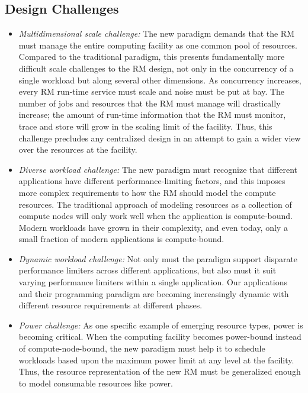 \documentclass[10pt]{article}
\begin{document}
\subsection{Design Challenges}
\label{sect:challenges}

\begin{itemize}
\item{\sl Multidimensional scale challenge:} The new paradigm demands that 
      the RM must manage the entire computing facility as one common pool of 
      resources. Compared to the traditional paradigm, this presents 
      fundamentally more difficult scale challenges to the RM design,
      not only in the concurrency of a single workload but along
      several other dimensions. As concurrency increases, every RM run-time
      service must scale and noise must be put at bay.  
      The number of jobs and resources 
      that the RM must manage will drastically increase; the amount 
      of run-time information that the RM must monitor, trace and store 
      will grow in the scaling limit of the facility.
      Thus, this challenge precludes any centralized design in an attempt to 
      gain a wider view over the resources at the facility. 

\item{\sl Diverse workload challenge:} The new paradigm must recognize that
      different applications have different performance-limiting factors,
      and this imposes more complex requirements to how the RM should
      model the compute resources. The traditional approach of modeling 
      resources as a collection of compute nodes will only work well when the
      application is compute-bound. Modern workloads have grown in their
      complexity, and even today, only a small fraction of modern applications
      is compute-bound.
       
\item{\sl Dynamic workload challenge:} Not only must the paradigm support 
      disparate performance limiters across different applications, but
      also must it suit varying performance limiters within 
      a single application. Our applications and their programming paradigm
      are becoming increasingly dynamic with different resource requirements
      at different phases.

\item{\sl Power challenge:} As one specific example of emerging resource types,
      power is becoming critical. When the computing
      facility becomes power-bound instead of compute-node-bound, the new
      paradigm must help it to schedule workloads based upon the 
      maximum power limit at any level at the facility. Thus, 
      the resource representation of the new RM must be generalized
      enough to model consumable resources like power.  
      

\end{itemize}
\end{document}
